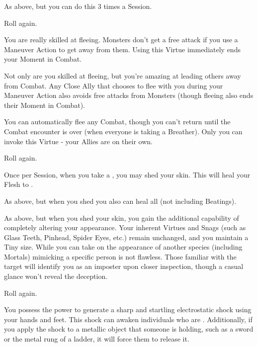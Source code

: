 \begin{multicols*}{2}
 As above, but you can do this 3 times a Session.

 Roll again. 

\NC[Name=Run Away!]

 You are really skilled at fleeing. Monsters don't get a free attack if you use a Maneuver Action to get away from them.  Using this Virtue immediately ends your Moment in Combat.

 Not only are you skilled at fleeing, but you're amazing at leading others away from Combat. Any Close Ally that chooses to flee with you during your Maneuver Action also avoids free attacks from Monsters (though fleeing also ends their Moment in Combat).

 You can automatically flee any Combat, though you can't return until the Combat encounter is over (when everyone is taking a Breather). Only you can invoke this Virtue - your Allies are on their own.

 Roll again.

\NC[Name=Shedding]

 Once per Session, when you take a , you may shed your skin.  This will heal your Flesh to \MAX.

 As above, but when you shed you also can heal all  (not including Beatings).

 As above, but when you shed your skin, you gain the additional capability of completely altering your appearance. Your inherent Virtues and Snags (such as Glass Teeth, Pinhead, Spider Eyes, etc.) remain unchanged, and you maintain a Tiny size. While you can take on the appearance of another species (including Mortals) mimicking a specific person is not flawless. Those familiar with the target will identify you as an imposter upon closer inspection, though a casual glance won't reveal the deception.

 Roll again.

\NC[Name=Shocky]

 You possess the power to generate a sharp and startling electrostatic shock using your hands and feet. This shock can awaken individuals who are . Additionally, if you apply the shock to a metallic object that someone is holding, such as a sword or the metal rung of a ladder, it will force them to release it.


\end{multicols*}
